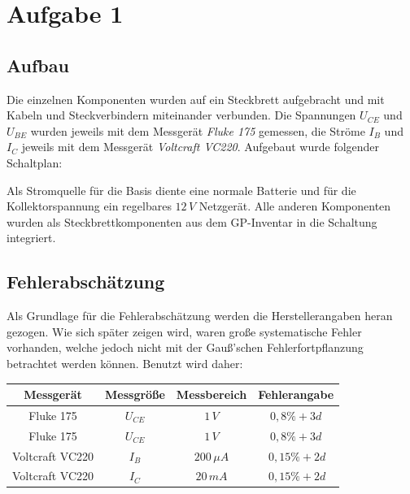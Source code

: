 \newpage
\section{Aufgabe 1}
\subsection{Aufbau}
Die einzelnen Komponenten wurden auf ein Steckbrett aufgebracht und mit Kabeln und Steckverbindern miteinander verbunden. Die Spannungen \(U_{CE}\) und \(U_{BE}\) wurden jeweils mit dem Messgerät {\it Fluke 175} gemessen, die Ströme \(I_B\) und \(I_C\) jeweils mit dem Messgerät {\it Voltcraft VC220}. Aufgebaut wurde folgender Schaltplan:
\begin{center}
\begin{minipage}{\linewidth}
\centering
{}
%
\label{Schaltplan1}
\end{minipage}
\end{center}
Als Stromquelle für die Basis diente eine normale Batterie und für die Kollektorspannung ein regelbares \(12\, V\) Netzgerät. Alle anderen Komponenten wurden als Steckbrettkomponenten aus dem GP-Inventar in die Schaltung integriert.

\subsection{Fehlerabschätzung}
Als Grundlage für die Fehlerabschätzung werden die Herstellerangaben heran gezogen. Wie sich später zeigen wird, waren große systematische Fehler vorhanden, welche jedoch nicht mit der Gauß'schen Fehlerfortpflanzung betrachtet werden können. Benutzt wird daher: 
\begin{center}
\begin{tabular}{c|c|c|c}
Messgerät & Messgröße & Messbereich & Fehlerangabe \\\hline
Fluke 175 & \(U_{CE}\) & \(1\, V\) & \(0,8\% +3d\) \\
Fluke 175 & \(U_{CE}\) & \(1\, V\) & \(0,8\% +3d\) \\
Voltcraft VC220 & \(I_{B}\) & \(200 \, \mu A \) & \(\ 0,15\% +2d\) \\
Voltcraft VC220 & \(I_{C}\) & \(20 \, mA \) & \(\ 0,15\% +2d\)
\end{tabular}
\end{center}

